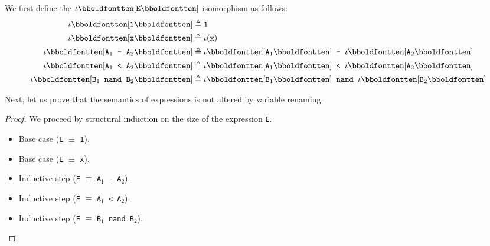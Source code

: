 \begin{answer}
  We first define the $\vren{\texttt{E}}$ isomorphism as follows:
  \begin{align*}
    \vren{\texttt{1}} &\isDefAs \texttt{1}\\
    \vren{\texttt{x}} &\isDefAs \iota(\texttt{x})\\
    \vren{\texttt{A}_1\texttt{ - }\texttt{A}_2} &\isDefAs \vren{\texttt{A}_1}\texttt{ - }\vren{\texttt{A}_2}\\
    \vren{\texttt{A}_1\texttt{ < }\texttt{A}_2} &\isDefAs \vren{\texttt{A}_1}\texttt{ < }\vren{\texttt{A}_2}\\
    \vren{\texttt{B}_1\texttt{ nand }\texttt{B}_2} &\isDefAs \vren{\texttt{B}_1}\texttt{ nand }\vren{\texttt{B}_2}\\
  \end{align*}
  
  Next, let us prove that the semantics of expressions is not altered by
  variable renaming.
  \begin{proof}
    We proceed by structural induction on the size of the expression \texttt{E}.
    \begin{itemize}
    \item Base case (\texttt{E} $\equiv$ \texttt{1}).
    \item Base case (\texttt{E} $\equiv$ \texttt{x}).
    \item Inductive step (\texttt{E} $\equiv$ \texttt{A}$_1$\texttt{ - A}$_2$).
    \item Inductive step (\texttt{E} $\equiv$ \texttt{A}$_1$\texttt{ < A}$_2$).
    \item Inductive step (\texttt{E} $\equiv$ \texttt{B}$_1$\texttt{ nand B}$_2$).
    \end{itemize}
  \end{proof}
\end{answer}

